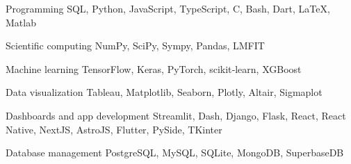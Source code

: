 
\begin{cvskills}

  \cvskill
  {Programming} %
  {SQL, Python, JavaScript, TypeScript, C, Bash, Dart, LaTeX, Matlab} %

  \cvskill
  {Scientific computing} %
  {NumPy, SciPy, Sympy, Pandas, LMFIT} %

  \cvskill
  {Machine learning} %
  {TensorFlow, Keras, PyTorch, scikit‑learn, XGBoost} %


  \cvskill
  {Data visualization} %
  {Tableau, Matplotlib, Seaborn, Plotly, Altair, Sigmaplot} %

  \cvskill
  {Dashboards and app development} %
  {Streamlit, Dash, Django, Flask, React, React Native, NextJS, AstroJS, Flutter, PySide, TKinter} %

  \cvskill
  {Database management} %
  {PostgreSQL, MySQL, SQLite, MongoDB, SuperbaseDB} %






\end{cvskills}
